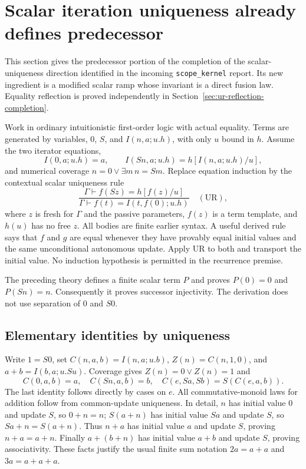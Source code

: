 \section{Scalar iteration uniqueness already defines predecessor}
\label{sec:ur-predecessor}

This section gives the predecessor portion of the completion of the
scalar-uniqueness direction identified in the incoming
\texttt{scope\_kernel} report.  Its new ingredient is a modified scalar
ramp whose invariant is a direct fusion law.  Equality reflection is
proved independently in Section~\ref{sec:ur-reflection-completion}.

Work in ordinary intuitionistic first-order logic with actual equality.
Terms are generated by variables, $0$, $S$, and
$I(n,a;u.h)$, with only $u$ bound in $h$.  Assume the two iterator equations,
\[
 I(0,a;u.h)=a,\qquad I(Sn,a;u.h)=h[I(n,a;u.h)/u],
\]
and numerical coverage $n=0\lor\exists m\,n=Sm$.
Replace equation induction by the contextual scalar uniqueness rule
\[
 \frac{\Gamma\vdash f(Sz)=h[f(z)/u]}
 {\Gamma\vdash f(t)=I(t,f(0);u.h)}\quad(\mathrm{UR}),
\]
where $z$ is fresh for $\Gamma$ and the passive parameters, $f(z)$ is a
term template, and $h(u)$ has no free $z$.  All bodies are finite earlier
syntax.  A useful derived rule says that $f$ and $g$ are equal whenever
they have provably equal initial values and the same unconditional
autonomous update.  Apply UR to both and transport the initial value.
No induction hypothesis is permitted in the recurrence premise.

\begin{theorem}
The preceding theory defines a finite scalar term $P$ and proves
$P(0)=0$ and $P(Sn)=n$.  Consequently it proves successor injectivity.
The derivation does not use separation of $0$ and $S0$.
\end{theorem}

\subsection{Elementary identities by uniqueness}
Write $1=S0$, set $C(n,a,b)=I(n,a;u.b)$, $Z(n)=C(n,1,0)$, and
$a+b=I(b,a;u.Su)$.  Coverage gives $Z(n)=0\lor Z(n)=1$ and
\[
 C(0,a,b)=a,\quad C(Sn,a,b)=b,\quad
 C(e,Sa,Sb)=S(C(e,a,b)).
\]
The last identity follows directly by cases on $e$.
All commutative-monoid laws for addition follow from common-update
uniqueness.  In detail, $n$ has initial value $0$ and update $S$, so
$0+n=n$; $S(a+n)$ has initial value $Sa$ and update $S$, so
$Sa+n=S(a+n)$.  Thus $n+a$ has initial value $a$ and update $S$,
proving $n+a=a+n$.  Finally $a+(b+n)$ has initial value $a+b$ and
update $S$, proving associativity.  These facts justify the usual finite
sum notation $2a=a+a$ and $3a=a+a+a$.

